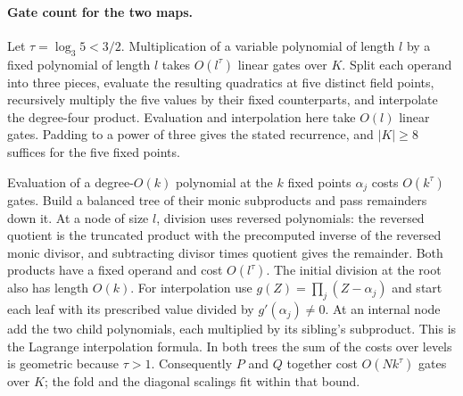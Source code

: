 \documentclass[11pt]{article}
\theoremstyle{definition}
\theoremstyle{remark}
\begin{document}
\paragraph{Gate count for the two maps.}
Let $\tau=\log_3 5<3/2$. Multiplication of a variable polynomial
of length $l$ by a fixed polynomial of length $l$ takes $O(l^\tau)$
linear gates over $K$. Split each operand into three pieces, evaluate
the resulting quadratics at five distinct field points, recursively
multiply the five values by their fixed counterparts, and interpolate
the degree-four product. Evaluation and interpolation here take $O(l)$
linear gates. Padding to a power of three gives the stated recurrence,
and $|K|\ge8$ suffices for the five fixed points.

Evaluation of a degree-$O(k)$ polynomial at the $k$ fixed points
$\alpha_j$ costs $O(k^\tau)$ gates. Build a balanced tree of their
monic subproducts and pass remainders down it. At a node of size $l$,
division uses reversed polynomials: the reversed quotient is the
truncated product with the precomputed inverse of the reversed monic
divisor, and subtracting divisor times quotient gives the remainder.
Both products have a fixed operand and cost $O(l^\tau)$. The initial
division at the root also has length $O(k)$. For interpolation use
$g(Z)=\prod_j(Z-\alpha_j)$ and start each leaf with its prescribed
value divided by $g'(\alpha_j)\ne0$. At an internal node add the two
child polynomials, each multiplied by its sibling's subproduct. This
is the Lagrange interpolation formula. In both trees the sum of the
costs over levels is geometric because $\tau>1$. Consequently $P$
and $Q$ together cost $O(Nk^\tau)$ gates over $K$; the fold and the
diagonal scalings fit within that bound.
\end{document}
